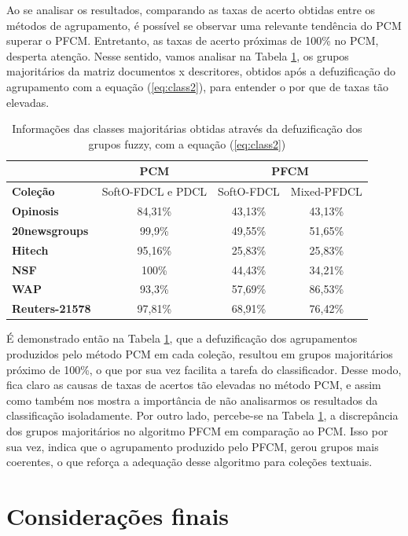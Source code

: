 Ao se analisar os resultados, comparando as taxas de acerto obtidas entre os métodos de agrupamento,
é possível se observar uma relevante tendência do PCM superar o PFCM. Entretanto, as taxas de acerto
próximas de 100\% no PCM, desperta atenção. Nesse sentido, vamos analisar na Tabela
\ref{table:pdclmajority}, os grupos majoritários da matriz documentos x descritores, obtidos após a
defuzificação do agrupamento com a equação (\ref{eq:class2}), para entender o por que de taxas tão
elevadas. 

\begin{table}[!htp]
  \centering
  \begin{tabular}{|l|c|c c|}
    \hline
    & PCM & \multicolumn{2}{c|}{PFCM} \\
    \hline
    {\bf Coleção} & SoftO-FDCL e PDCL & SoftO-FDCL & Mixed-PFDCL \\
    \hline
    {\bf Opinosis} & 84,31\% & 43,13\% & 43,13\% \\
    \hline
    {\bf 20newsgroups} & 99,9\% & 49,55\% & 51,65\% \\
    \hline
    {\bf Hitech} & 95,16\% & 25,83\% & 25,83\% \\
    \hline
    {\bf NSF} & 100\% & 44,43\% &  34,21\% \\
    \hline
    {\bf WAP} & 93,3\% & 57,69\% & 86,53\% \\
    \hline
    {\bf Reuters-21578} & 97,81\% & 68,91\% & 76,42\% \\
    \hline
  \end{tabular}
  \caption{Informações das classes majoritárias obtidas através da defuzificação dos grupos fuzzy,
  com a equação (\ref{eq:class2})}
  \label{table:pdclmajority}
\end{table}

É demonstrado então na Tabela \ref{table:pdclmajority}, que a defuzificação dos agrupamentos
produzidos pelo método PCM em cada coleção, resultou em grupos majoritários próximo de 100\%, o que
por sua vez facilita a tarefa do classificador. Desse modo, fica claro as causas de taxas de acertos
tão elevadas no método PCM, e assim como também nos mostra a importância de não analisarmos os
resultados da classificação isoladamente. Por outro lado, percebe-se na Tabela
\ref{table:pdclmajority}, a discrepância dos grupos majoritários no algoritmo PFCM em comparação ao
PCM. Isso por sua vez, indica que o agrupamento produzido pelo PFCM, gerou grupos mais coerentes, o
que reforça a adequação desse algoritmo para coleções textuais.



\section{Considerações finais}



